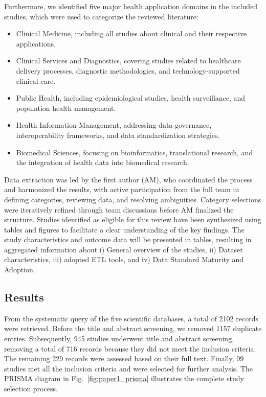 Furthermore, we identified five major health application domains in the included studies, which were used to categorize the reviewed literature:

\begin{itemize}
  \item[i)] Clinical Medicine, including all studies about clinical and their respective applications.
  \item[ii)] Clinical Services and Diagnostics, covering studies related to healthcare delivery processes, diagnostic methodologies, and technology-supported clinical care.
  \item[iii)] Public Health, including epidemiological studies, health surveillance, and population health management.
  \item[iv)] Health Information Management, addressing data governance, interoperability frameworks, and data standardization strategies.
  \item[v)] Biomedical Sciences, focusing on bioinformatics, translational research, and the integration of health data into biomedical research.
\end{itemize}

Data extraction was led by the first author (AM), who coordinated the process and harmonized the results, with active participation from the full team in defining categories, reviewing data, and resolving ambiguities. Category selections were iteratively refined through team discussions before AM finalized the structure. Studies identified as eligible for this review have been synthesized using tables and figures to facilitate a clear understanding of the key findings. The study characteristics and outcome data will be presented in tables, resulting in aggregated information about i) General overview of the studies, ii) Dataset characteristics, iii) adopted ETL tools, and iv) Data Standard Maturity and Adoption.

\subsection{Results}
\label{sec:paper1_results}

From the systematic query of the five scientific databases, a total of 2102 records were retrieved. Before the title and abstract screening, we removed 1157 duplicate entries. Subsequently, 945 studies underwent title and abstract screening, removing a total of 716 records because they did not meet the inclusion criteria. The remaining 229 records were assessed based on their full text. Finally, 99 studies met all the inclusion criteria and were selected for further analysis. The PRISMA diagram in Fig.~\ref{fig:paper1_prisma} illustrates the complete study selection process.

